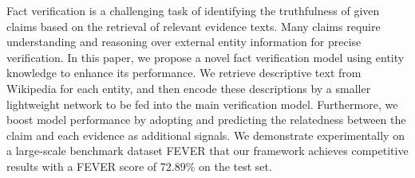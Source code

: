 Fact verification is a challenging task of identifying the truthfulness of  given claims based on the retrieval of relevant evidence texts. Many claims require understanding and reasoning over external entity information for precise verification. In this paper, we propose a novel fact verification model using entity knowledge to enhance its performance. We retrieve descriptive text from Wikipedia for each entity, and then encode these descriptions by a smaller lightweight network to be fed into the main verification model. Furthermore, we boost model performance by adopting and predicting the relatedness between the claim and each evidence as additional signals. We demonstrate experimentally on a large-scale benchmark dataset FEVER that our framework  achieves competitive results with a FEVER score of 72.89\% on the test set.
